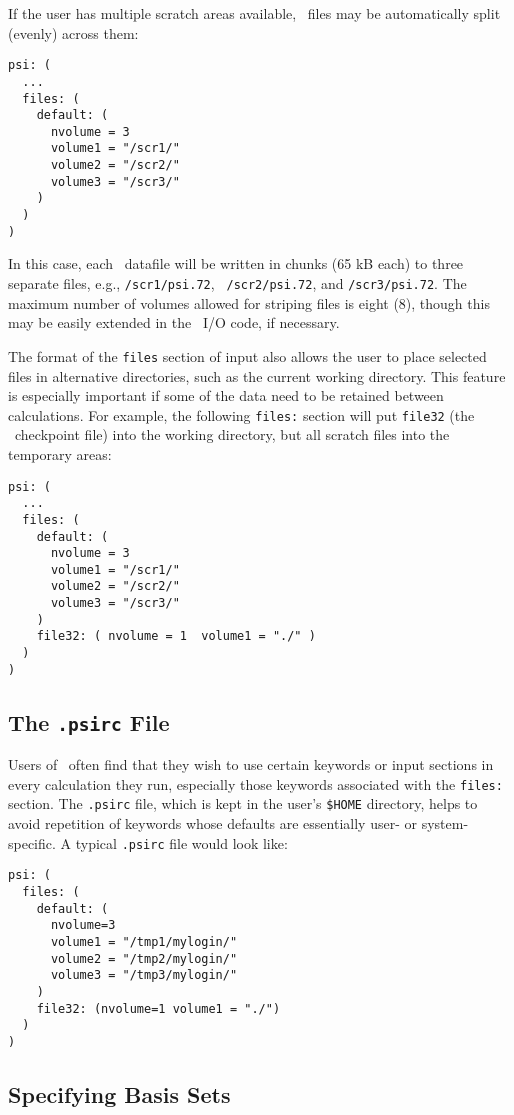 If the user has multiple scratch areas available, \PSIthree\ files may
be automatically split (evenly) across them:
\begin{verbatim}
psi: (
  ...
  files: (
    default: (
      nvolume = 3
      volume1 = "/scr1/"
      volume2 = "/scr2/"
      volume3 = "/scr3/"
    )
  )
)
\end{verbatim}
In this case, each \PSIthree\ datafile will be written in chunks (65
kB each) to three separate files, e.g., {\tt /scr1/psi.72}, {\tt
/scr2/psi.72}, and {\tt /scr3/psi.72}.  The maximum number of volumes
allowed for striping files is eight (8), though this may be easily
extended in the \PSIthree\ I/O code, if necessary.

The format of the {\tt files} section of input also allows the user to
place selected files in alternative directories, such as the current
working directory.  This feature is especially important if some of
the data need to be retained between calculations.  For example, the
following {\tt files:} section will put {\tt file32} (the \PSIthree\
checkpoint file) into the working directory, but all scratch files
into the temporary areas:
\begin{verbatim}
psi: (
  ...
  files: (
    default: (
      nvolume = 3
      volume1 = "/scr1/"
      volume2 = "/scr2/"
      volume3 = "/scr3/"
    )
    file32: ( nvolume = 1  volume1 = "./" )
  )
)
\end{verbatim}

\subsection{The {\tt .psirc} File} \label{psirc}

Users of \PSIthree\ often find that they wish to use certain keywords
or input sections in every calculation they run, especially those
keywords associated with the {\tt files:} section.  The {\tt .psirc}
file, which is kept in the user's {\tt \$HOME} directory, helps to
avoid repetition of keywords whose defaults are essentially user- or
system-specific.  A typical {\tt .psirc} file would look like:
\begin{verbatim}
psi: (
  files: (
    default: (
      nvolume=3
      volume1 = "/tmp1/mylogin/"
      volume2 = "/tmp2/mylogin/"
      volume3 = "/tmp3/mylogin/"
    )
    file32: (nvolume=1 volume1 = "./")
  )
)
\end{verbatim}

\subsection{Specifying Basis Sets} \label{basis-spec}

